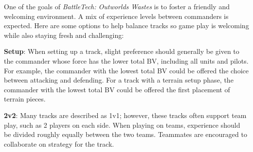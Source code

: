 One of the goals of \emph{BattleTech: Outworlds Wastes} is to foster a friendly and welcoming environment.
A mix of experience levels between commanders is expected.
Here are some options to help balance tracks so game play is welcoming while also staying fresh and challenging:

\begin{description}

\item {\bfseries Setup}: When setting up a track, slight preference should generally be given to the commander whose force has the lower total BV, including all units and pilots.
For example, the commander with the lowest total BV could be offered the choice between attacking and defending.
For a track with a terrain setup phase, the commander with the lowest total BV could be offered the first placement of terrain pieces.

\item {\bfseries 2v2}: Many tracks are described as 1v1; however, these tracks often support team play, such as 2 players on each side.
When playing on teams, experience should be divided roughly equally between the two teams.
Teammates are encouraged to collaborate on strategy for the track.

\end{description}

